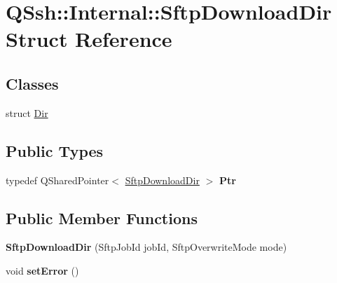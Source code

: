 \hypertarget{struct_q_ssh_1_1_internal_1_1_sftp_download_dir}{}\section{Q\+Ssh\+:\+:Internal\+:\+:Sftp\+Download\+Dir Struct Reference}
\label{struct_q_ssh_1_1_internal_1_1_sftp_download_dir}
\subsection*{Classes}
\begin{DoxyCompactItemize}
\item 
struct \mbox{\hyperlink{struct_q_ssh_1_1_internal_1_1_sftp_download_dir_1_1_dir}{Dir}}
\end{DoxyCompactItemize}
\subsection*{Public Types}
\begin{DoxyCompactItemize}
\item 
\mbox{\label{struct_q_ssh_1_1_internal_1_1_sftp_download_dir_a3e04beb2b505b97b94b4eb5b4ed94b5c}} 
typedef Q\+Shared\+Pointer$<$ \mbox{\hyperlink{struct_q_ssh_1_1_internal_1_1_sftp_download_dir}{Sftp\+Download\+Dir}} $>$ {\bfseries Ptr}
\end{DoxyCompactItemize}
\subsection*{Public Member Functions}
\begin{DoxyCompactItemize}
\item 
\mbox{\label{struct_q_ssh_1_1_internal_1_1_sftp_download_dir_a7fac1e982bc8b04537640661ebfe3067}} 
{\bfseries Sftp\+Download\+Dir} (Sftp\+Job\+Id job\+Id, Sftp\+Overwrite\+Mode mode)
\item 
\mbox{\label{struct_q_ssh_1_1_internal_1_1_sftp_download_dir_af833d796ccfb363eeb62e8d4e8134bbf}} 
void {\bfseries set\+Error} ()
\end{DoxyCompactItemize}
